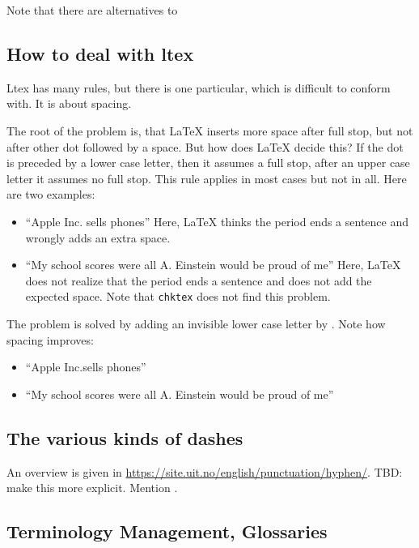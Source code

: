 \documentclass[a4paper,12pt]{article}
\begin{document}
Note that there are alternatives to 


\subsection{How to deal with ltex}\label{subsec:ltex}

Ltex has many rules, but there is one particular, which is difficult to conform with. 
It is about spacing. 

The root of the problem is, that \LaTeX{} inserts more space after full stop, 
but not after other dot followed by a space. 
But how does \LaTeX{} decide this? If the dot is preceded by a lower case letter, 
then it assumes a full stop, after an upper case letter it assumes no full stop. 
This rule applies in most cases but not in all. 
Here are two examples: 
%
\begin{itemize}
  \item ``Apple Inc. sells phones''%
  Here, \LaTeX{} thinks the period ends a sentence and wrongly adds an extra space.
  \item ``My school scores were all A. Einstein would be proud of me''
  Here, \LaTeX{} does not realize that the period ends a sentence 
  and does not add the expected space. 
  Note that \texttt{chktex} does not find this problem. 
\end{itemize}

The problem is solved by adding an invisible lower case letter by \texttt{\textbackslash@}. 
Note how spacing improves: 
%
\begin{itemize}
  \item ``Apple Inc.\@ sells phones''
  \item ``My school scores were all A\@. Einstein would be proud of me''
\end{itemize}

\subsection{The various kinds of dashes}\label{subsec:dashes}

An overview is given in 
\url{https://site.uit.no/english/punctuation/hyphen/}. 
TBD\@: make this more explicit. 
Mention . 

\subsection{Terminology Management, Glossaries}\label{subsec:glos}
\end{document}
